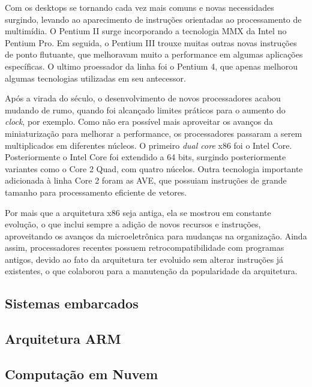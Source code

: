 \documentclass{article}
\begin{document}
Com os desktops se tornando cada vez mais comuns e novas necessidades surgindo,
levando ao aparecimento de instruções orientadas ao processamento de multimídia.
O Pentium II surge incorporando a tecnologia MMX da Intel no Pentium Pro. Em
seguida, o Pentium III trouxe muitas outras novas instruções de ponto flutuante,
que melhoravam muito a performance em algumas aplicações específicas. O ultimo
proessador da linha foi o Pentium 4, que apenas melhorou algumas tecnologias
utilizadas em seu antecessor.

Após a virada do século, o desenvolvimento de novos processadores acabou mudando
de rumo, quando foi alcançado limites práticos para o aumento do \textit{clock},
por exemplo. Como não era possível mais aproveitar os avanços da miniaturização
para melhorar a performance, os processadores passaram a serem multiplicados
em diferentes núcleos. O primeiro \textit{dual core} x86 foi o Intel Core.
Posteriormente o Intel Core foi extendido a 64 bits, surgindo posteriormente
variantes como o Core 2 Quad, com quatro núcelos. Outra tecnologia importante
adicionada à linha Core 2 foram as AVE, que possuiam instruções de grande
tamanho para processamento eficiente de vetores.

Por mais que a arquitetura x86 seja antiga, ela se mostrou em constante
evolução, o que inclui sempre a adição de novos recursos e instruções,
aproveitando os avanços da microeletrônica para mudanças na organização. Ainda
assim, processadores recentes possuem retrocompatibilidade com programas
antigos, devido ao fato da arquitetura ter evoluido sem alterar instruções já
existentes, o que colaborou para a manutenção da popularidade da arquitetura.

\subsection{Sistemas embarcados}

\subsection{Arquitetura ARM} 

\subsection{Computação em Nuvem}
\end{document}
